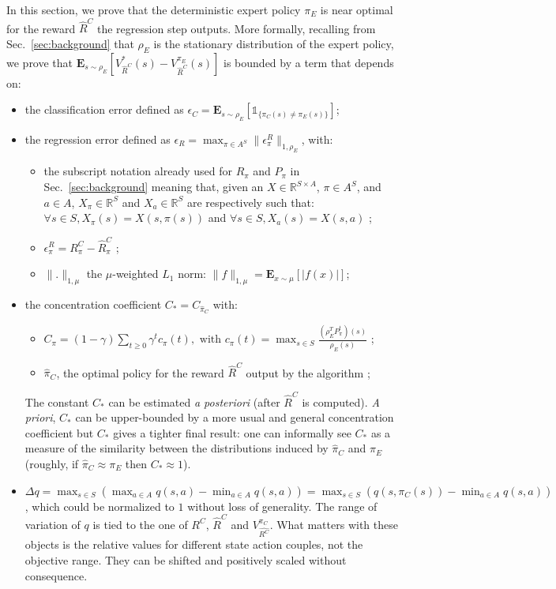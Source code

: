 \documentclass{llncs}
\newcommand{\E}{\mathbf{E}}
\begin{document}
In this section, we prove that the deterministic expert policy $\pi_E$ is near optimal for the reward $\hat{R}^C$ the regression step outputs.
More formally, recalling from Sec.~\ref{sec:background} that $\rho_E$ is the stationary distribution of the expert policy, we prove that $\E_{s\sim\rho_E}[V^*_{\hat{R}^C}(s)-V^{\pi_E}_{\hat{R}^C}(s)]$ is bounded by a term that depends on:
\begin{itemize}
  \item the classification error defined as
$\epsilon_C=\E_{s\sim\rho_E}[\mathds{1}_{\{\pi_C(s)\neq\pi_E(s)\}}]$;
\item the regression error defined as
 $   \epsilon_R=\max_{\pi\in A^S}\|\epsilon_\pi^R\|_{1,\rho_E}$,
  with:
  \begin{itemize}
  \item the subscript notation already used for $R_\pi$ and $P_\pi$ in Sec.~\ref{sec:background} meaning that, given an $X\in\mathbb{R}^{S\times A}$, $\pi\in A^S$, and $a\in A$,  $X_\pi\in\mathbb{R}^S$ and $X_a\in\mathbb{R}^S$ are respectively such that: $\forall s\in S, X_\pi(s)=X(s,\pi(s))$ and $\forall s\in S, X_a(s)=X(s,a)$ ;
  \item $\epsilon^R_\pi=R^C_\pi-\hat{R}^C_\pi$ ;
  \item $\|.\|_{1,\mu}$ the $\mu$-weighted $L_1$ norm: $\|f\|_{1,\mu} = \E_{x\sim \mu}[|f(x)|]$;
  \end{itemize}
\item the concentration coefficient $C_* = C_{\hat \pi_C}$ with:
  \begin{itemize}
  \item $C_{\pi}=(1-\gamma)\sum_{t\geq0}\gamma^tc_{\pi}(t), \text{ with } c_{\pi}(t)=\max_{s\in S}\frac{(\rho_E^TP^t_\pi)(s)}{\rho_E(s)}$ ;
  \item $\hat \pi_C$, the optimal policy for the reward $\hat R^C$ output by the algorithm ;
  \end{itemize}
  The constant $C_*$ can be estimated \emph{a posteriori} (after $\hat{R}^C$ is computed). {\it A priori}, $C_*$ can be upper-bounded by a more usual and general concentration coefficient but $C_*$ gives a tighter final result: one can informally see $C_*$ as a measure of the similarity between the distributions induced by $\hat\pi_C$ and $\pi_E$ (roughly, if $\hat{\pi}_C\approx\pi_E$ then $C_* \approx 1$).
\item $\Delta q = \max_{s\in S}(\max_{a\in A}q(s,a)-\min_{a\in A}q(s,a))=\max_{s\in S}(q(s,\pi_C(s))-\min_{a\in A}q(s,a))$,
    which could be normalized to $1$ without loss of generality. The range of variation of $q$ is tied to the one of $R^C$, $\hat{R}^C$ and $V^{\pi_C}_{\hat{R^C}}$. What matters with these objects is the relative values for different state action couples, not the objective range. They can be shifted and positively scaled without consequence.
  \end{itemize}
\end{document}
